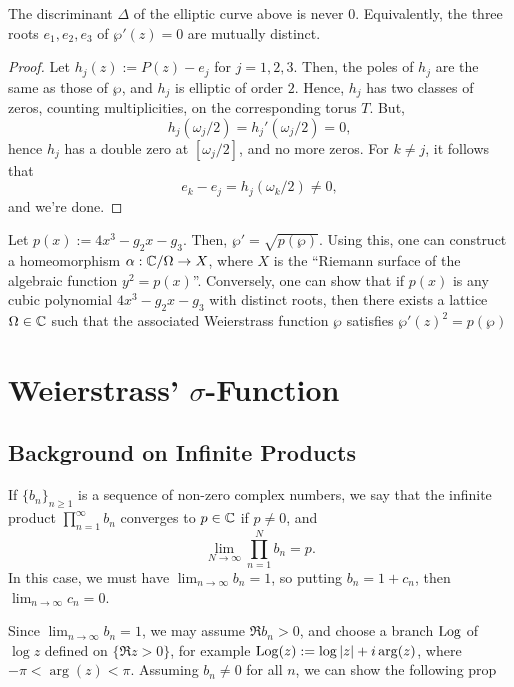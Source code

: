 \documentclass[11pt]{article}
\begin{document}
\begin{prop}
    The discriminant $\Delta$ of the elliptic curve above is never $0$. Equivalently, the three roots $e_1,e_2,e_3$ of $\wp'(z)=0$ are mutually distinct.
\end{prop}

\begin{proof}
    Let $h_j(z) := P(z)-e_j$ for $j=1,2,3$. Then, the poles of $h_j$ are the same as those of $\wp$, and $h_j$ is elliptic of order $2$. Hence, $h_j$ has two classes of zeros, counting multiplicities, on the corresponding torus $T$. But,
    $$h_j(\omega_j/2) = h_j'(\omega_j/2)=0,$$
    hence $h_j$ has a double zero at $[\omega_j/2]$, and no more zeros. For $k \neq j$, it follows that
    $$e_k  -e_j= h_j(\omega_k/2) \neq 0,$$
    and we're done.
\end{proof}

\begin{rmk}
    Let $p(x):= 4x^3 -g_2x-g_3$. Then, $\wp' = \sqrt{p(\wp)}$. Using this, one can construct a homeomorphism $\alpha: \mathbb{C} /\Omega \to X$, where $X$ is the ``Riemann surface of the algebraic function $y^2 = p(x)$''. Conversely, one can show that if $p(x)$ is any cubic polynomial $4x^3-g_2x-g_3$ with distinct roots, then there exists a lattice $\Omega \in \mathbb{C}$ such that the associated Weierstrass function $\wp$ satisfies $\wp'(z)^2 = p(\wp)$
\end{rmk}

\section{\texorpdfstring{Weierstrass' $\sigma$-Function}{Weierstrass' Sigma Function}}

\subsection{Background on Infinite Products}

If $\{b_n\}_{n \geq 1}$ is a sequence of non-zero complex numbers, we say that the infinite product $\prod_{n=1}^\infty b_n$ converges to $p \in \mathbb{C}$ if $p \neq 0$, and
$$\lim_{N \to \infty}\prod_{n=1}^Nb_n=p.$$
In this case, we must have $\lim_{n \to \infty}b_n =1$, so putting $b_n = 1+c_n$, then $\lim_{n \to \infty}c_n =0$.

Since $\lim_{n \to \infty}b_n=1$, we may assume $\Re b_n>0$, and choose a branch $\operatorname{Log}$ of $\log z$ defined on $\{\Re z>0\}$, for example $\operatorname{Log}(z) := \log|z| + i\arg (z)$, where $-\pi < \arg(z) < \pi$. Assuming $b_n \neq 0$ for all $n$, we can show the following prop
\end{document}
